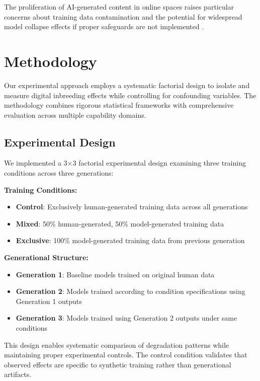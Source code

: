 \documentclass[11pt]{article}
\begin{document}
The proliferation of AI-generated content in online spaces raises particular concerns about training data contamination and the potential for widespread model collapse effects if proper safeguards are not implemented \citep{solaiman2019release}.

\section{Methodology}

Our experimental approach employs a systematic factorial design to isolate and measure digital inbreeding effects while controlling for confounding variables. The methodology combines rigorous statistical frameworks with comprehensive evaluation across multiple capability domains.

\subsection{Experimental Design}

We implemented a 3×3 factorial experimental design examining three training conditions across three generations:

\textbf{Training Conditions:}
\begin{itemize}
    \item \textbf{Control}: Exclusively human-generated training data across all generations
    \item \textbf{Mixed}: 50\% human-generated, 50\% model-generated training data
    \item \textbf{Exclusive}: 100\% model-generated training data from previous generation
\end{itemize}

\textbf{Generational Structure:}
\begin{itemize}
    \item \textbf{Generation 1}: Baseline models trained on original human data
    \item \textbf{Generation 2}: Models trained according to condition specifications using Generation 1 outputs
    \item \textbf{Generation 3}: Models trained using Generation 2 outputs under same conditions
\end{itemize}

This design enables systematic comparison of degradation patterns while maintaining proper experimental controls. The control condition validates that observed effects are specific to synthetic training rather than generational artifacts.
\end{document}
